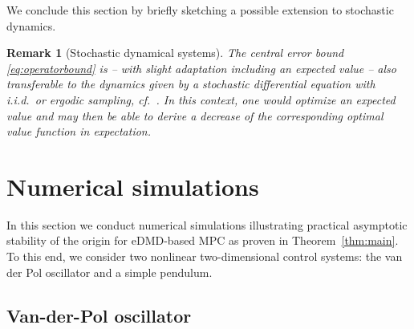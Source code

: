 \documentclass{article}
\numberwithin{equation}{section}
\newtheorem{remark}[theorem]{Remark}
\begin{document}
	\noindent We conclude this section by briefly sketching a possible extension to stochastic dynamics.
	\begin{remark}[Stochastic dynamical systems]
		The central error bound \eqref{eq:operatorbound} is -- with slight adaptation including an expected value -- also transferable to the dynamics given by a stochastic differential equation with i.i.d.\ or ergodic sampling, cf.\ \cite{NuskPeit23}. In this context, one would optimize an expected value and may then be able to derive a decrease of the corresponding optimal value function in expectation. 
	\end{remark}
	
	
	
	
	\section{Numerical simulations}
	\label{sec:example}
	
	In this section we %
	conduct numerical simulations illustrating practical asymptotic stability of the origin for eDMD-based MPC as proven in Theorem~\ref{thm:main}. To this end, we consider two nonlinear two-dimensional control systems: the van der Pol oscillator and a simple pendulum.
	
	
	
	\subsection{Van-der-Pol oscillator} \label{subsec:vanderpol}
	
\end{document}
